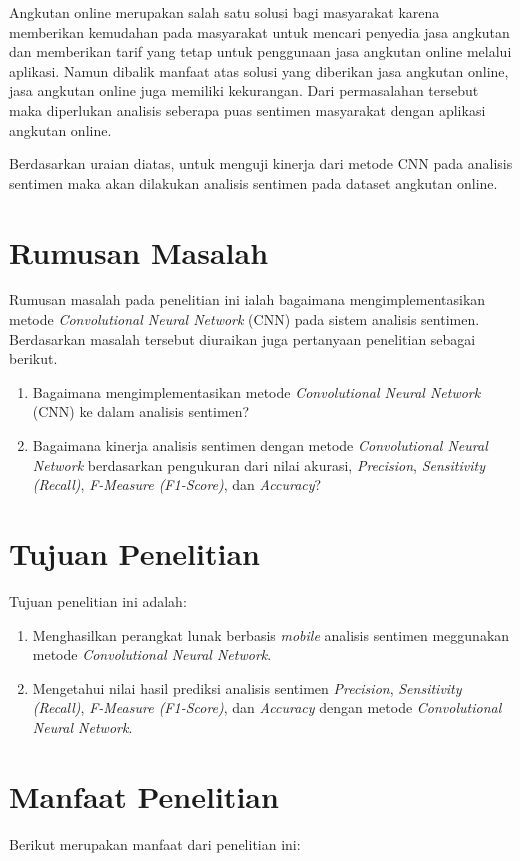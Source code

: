 Angkutan online merupakan salah satu solusi bagi masyarakat karena memberikan kemudahan pada
masyarakat untuk mencari penyedia jasa angkutan dan memberikan tarif yang tetap untuk penggunaan
jasa angkutan online melalui aplikasi. Namun dibalik manfaat atas solusi yang diberikan jasa
angkutan online, jasa angkutan online juga memiliki kekurangan. Dari permasalahan tersebut maka
diperlukan analisis seberapa puas sentimen masyarakat dengan aplikasi angkutan online.

Berdasarkan uraian diatas, untuk menguji kinerja dari metode CNN pada analisis sentimen maka akan 
dilakukan analisis sentimen pada dataset angkutan online.

\section{Rumusan Masalah}
Rumusan masalah pada penelitian ini ialah bagaimana mengimplementasikan metode
\emph{Convolutional Neural Network} (CNN) pada sistem analisis sentimen.
Berdasarkan masalah tersebut diuraikan juga pertanyaan penelitian sebagai berikut.

\begin{enumerate}
\item Bagaimana mengimplementasikan metode \emph{Convolutional Neural Network} (CNN) ke dalam analisis sentimen?
\item Bagaimana kinerja analisis sentimen dengan metode \emph{Convolutional Neural Network} berdasarkan pengukuran dari nilai akurasi, \emph{Precision}, \emph{Sensitivity (Recall)}, \emph{F-Measure (F1-Score)}, dan \emph{Accuracy}?
\end{enumerate}


\section{Tujuan Penelitian}
Tujuan penelitian ini adalah:

\begin{enumerate}
\item Menghasilkan perangkat lunak berbasis \emph{mobile} analisis sentimen meggunakan metode \emph{Convolutional Neural Network}.
\item Mengetahui nilai hasil prediksi analisis sentimen \emph{Precision}, \emph{Sensitivity (Recall)}, \emph{F-Measure (F1-Score)}, dan \emph{Accuracy} dengan metode \emph{Convolutional Neural Network}.
\end{enumerate}

\section{Manfaat Penelitian}
Berikut merupakan manfaat dari penelitian ini:

